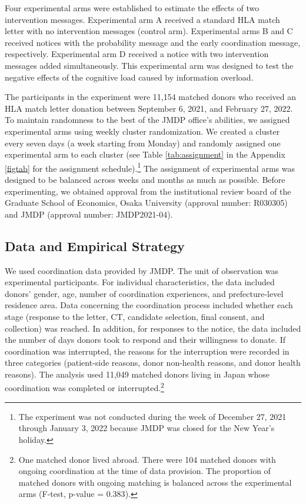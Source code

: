 \documentclass [12pt, a4paper]{article}
\begin{document}
Four experimental arms were established to estimate the effects of two intervention messages. Experimental arm A received a standard HLA match letter with no intervention messages (control arm). Experimental arms B and C received notices with the probability message and the early coordination message, respectively. Experimental arm D received a notice with two intervention messages added simultaneously. This experimental arm was designed to test the negative effects of the cognitive load caused by information overload.

The participants in the experiment were 11,154 matched donors who received an HLA match letter donation between September 6, 2021, and February 27, 2022. To maintain randomness to the best of the JMDP office's abilities, we assigned experimental arms using weekly cluster randomization. We created a cluster every seven days (a week starting from Monday) and randomly assigned one experimental arm to each cluster (see Table \ref{tab:assignment} in the Appendix \ref{figtab} for the assignment schedule).\footnote{The experiment was not conducted during the week of December 27, 2021 through January 3, 2022 because JMDP was closed for the New Year's holiday.} The assignment of experimental arms was designed to be balanced across weeks and months as much as possible. Before experimenting, we obtained approval from the institutional review board of the Graduate School of Economics, Osaka University (approval number: R030305) and JMDP (approval number: JMDP2021-04).

\hypertarget{data-and-empirical-strategy}{%
\subsection{Data and Empirical Strategy}\label{data-and-empirical-strategy}}

We used coordination data provided by JMDP. The unit of observation was experimental participants. For individual characteristics, the data included donors' gender, age, number of coordination experiences, and prefecture-level residence area. Data concerning the coordination process included whether each stage (response to the letter, CT, candidate selection, final consent, and collection) was reached. In addition, for responses to the notice, the data included the number of days donors took to respond and their willingness to donate. If coordination was interrupted, the reasons for the interruption were recorded in three categories (patient-side reasons, donor non-health reasons, and donor health reasons). The analysis used 11,049 matched donors living in Japan whose coordination was completed or interrupted.\footnote{One matched donor lived abroad. There were 104 matched donors with ongoing coordination at the time of data provision. The proportion of matched donors with ongoing matching is balanced across the experimental arms (F-test, p-value = \(0.383\)).}
\end{document}
